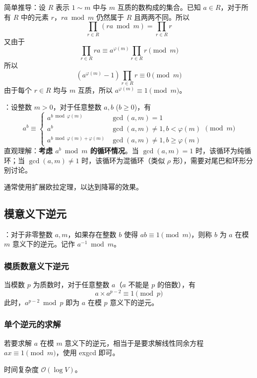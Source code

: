 简单推导：设 $R$ 表示 $1 \sim m$ 中与 $m$ 互质的数构成的集合。已知 $a\in R$，对于所有 $R$ 中的元素 $r$，$ra \bmod m$ 仍然属于 $R$ 且两两不同。所以
\[
\prod_{r \in R} (ra \bmod m) = \prod_{r \in R} r
\]
又由于
\[
\prod_{r \in R} ra \equiv a^{\varphi(m)} \prod_{r \in R} r \pmod m
\]
所以
\[
(a^{\varphi(m)} - 1) \prod_{r \in R} r \equiv 0 \pmod m
\]
由于每个 $r\in R$ 均与 $m$ 互质，所以 $a^{\varphi(m)} \equiv 1 \pmod m$。

：设整数 $m > 0$，对于任意整数 $a, b$ ($b \geq 0$)，有
\[
a^b \equiv \begin{cases}
a^{b \bmod \varphi(m)} & \gcd(a, m) = 1 \\
a^b & \gcd(a, m) \neq 1, b < \varphi(m) \\
a^{b \bmod \varphi(m) + \varphi(m)} & \gcd(a, m) \neq 1, b \geq \varphi(m)
\end{cases}
\pmod m
\]
直观理解：\textbf{考虑 $a^b \bmod m$ 的循环情况}。当 $\gcd(a, m) = 1$ 时，该循环为纯循环；当 $\gcd(a, m) \neq 1$ 时，该循环为混循环（类似 $\rho$ 形），需要对尾巴和环形分别讨论。

通常使用扩展欧拉定理，以达到降幂的效果。

\subsection{模意义下逆元}

：对于非零整数 $a, m$，如果存在整数 $b$ 使得 $ab \equiv 1 \pmod m$，则称 $b$ 为 $a$ 在模 $m$ 意义下的逆元。记作 $a^{-1} \bmod m$。

\subsubsection{模质数意义下逆元}

当模数 $p$ 为质数时，对于任意整数 $a$（$a$ 不能是 $p$ 的倍数），有
\[
a \times a^{p - 2} \equiv 1 \pmod p
\]
此时，$a^{p - 2} \bmod p$ 即为 $a$ 在模 $p$ 意义下的逆元。

\subsubsection{单个逆元的求解}

若要求解 $a$ 在模 $m$ 意义下的逆元，相当于是要求解线性同余方程 $ax \equiv 1 \pmod m$，使用 exgcd 即可。

时间复杂度 $\mathcal{O}(\log V)$。


